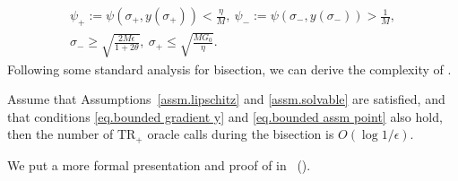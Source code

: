 \documentclass{mcom-l}
\newcommand{\trp}{\textrm{TR}_+}
\numberwithin{equation}{section}
\begin{document}
\begin{gather}
    \label{eq.bisection condition}
    \psi_+:=\psi(\sigma_+,y(\sigma_+))<\frac{\eta}{M}, \ \psi_-:=\psi(\sigma_-,y(\sigma_-))>\frac{1}{M},\\
    \label{eq.bracket points condition}
    \sigma_- \geq \sqrt{\frac{2M\epsilon}{1+2\theta}}, \ \sigma_+ \leq \sqrt{\frac{MG_0}{\eta}}.
\end{gather}
Following some standard analysis for bisection, we can derive the complexity of .
\begin{lemma}
    \label{lem.complexity bisection}
    Assume that Assumptions~\ref{assm.lipschitz} and \ref{assm.solvable} are satisfied, and that conditions \eqref{eq.bounded gradient y} and \eqref{eq.bounded assm point} also hold, then the number of $\trp$ oracle calls during the bisection is $O(\log 1/\epsilon)$.
\end{lemma}
We put a more formal presentation and proof of  in ~().
\end{document}
